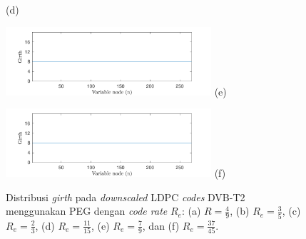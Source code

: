 \begin{figure}[tb]
\begin{minipage}{.5\linewidth}
		\vspace{-1cm}
		\center (d)
	\end{minipage}
	\hspace{-0.2 cm}
	\begin{minipage}{.5\linewidth}
		\hspace{-0.45 cm}
		\includegraphics[width=3in]{pics/girth/girthpeg7-9.pdf}
		\vspace{-1cm}
		\center (e)
	\end{minipage}
	\hfill
	\hspace{-0.2 cm}
	\begin{minipage}{.5\linewidth}
		\hspace{-0.45 cm}
		\includegraphics[width=3in]{pics/girth/girthpeg37-45.pdf}
		\vspace{-1cm}
		\center (f)
	\end{minipage}
	\caption {Distribusi \textit{girth} pada \textit{downscaled} LDPC \textit{codes} DVB-T2 menggunakan PEG dengan \textit{code rate} $R_e$: (a) $ R=\frac{4}{9} $, (b) $R_e=\frac{3}{5}$, (c) $R_e=\frac{2}{3}$, (d) $R_e=\frac{11}{15}$, (e) $R_e=\frac{7}{9}$, dan (f) $R_e=\frac{37}{45}$.}
	\label{gambar: girthpeg}
\end{figure}

